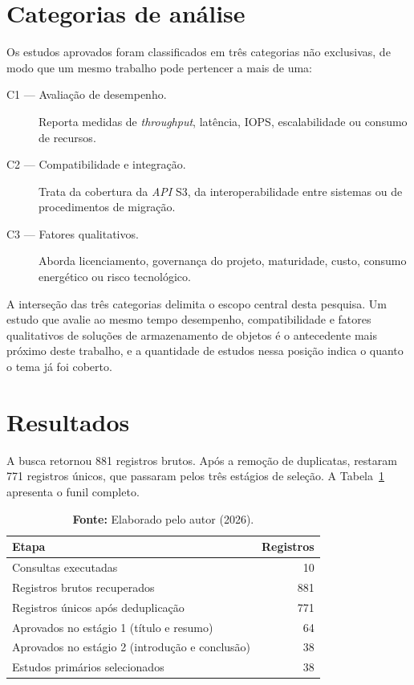 \section{Categorias de análise}
\label{sec:categorias}

Os estudos aprovados foram classificados em três categorias não exclusivas, de
modo que um mesmo trabalho pode pertencer a mais de uma:

\begin{description}
    \item[C1 --- Avaliação de desempenho.] Reporta medidas de \textit{throughput},
          latência, IOPS, escalabilidade ou consumo de recursos.
    \item[C2 --- Compatibilidade e integração.] Trata da cobertura da \textit{API}
          S3, da interoperabilidade entre sistemas ou de procedimentos de migração.
    \item[C3 --- Fatores qualitativos.] Aborda licenciamento, governança do
          projeto, maturidade, custo, consumo energético ou risco tecnológico.
\end{description}

A interseção das três categorias delimita o escopo central desta pesquisa. Um
estudo que avalie ao mesmo tempo desempenho, compatibilidade e fatores
qualitativos de soluções de armazenamento de objetos é o antecedente mais
próximo deste trabalho, e a quantidade de estudos nessa posição indica o quanto
o tema já foi coberto.

\section{Resultados}
\label{sec:resultados-mapeamento}

A busca retornou 881 registros brutos. Após a remoção de duplicatas, restaram
771 registros únicos, que passaram pelos três estágios de seleção. A
Tabela~\ref{tab:funil} apresenta o funil completo.

\begin{table}[htb]
\centering
\caption{Funil de seleção dos estudos.}
\label{tab:funil}
\begin{tabular}{@{}lr@{}}
\toprule
\textbf{Etapa} & \textbf{Registros} \\
\midrule
Consultas executadas                          & 10 \\
Registros brutos recuperados                  & 881 \\
Registros únicos após deduplicação            & 771 \\
Aprovados no estágio 1 (título e resumo)      & 64 \\
Aprovados no estágio 2 (introdução e conclusão) & 38 \\
Estudos primários selecionados                & 38 \\
\bottomrule
\end{tabular}
\caption*{\textbf{Fonte:} Elaborado pelo autor (2026).}
\end{table}

